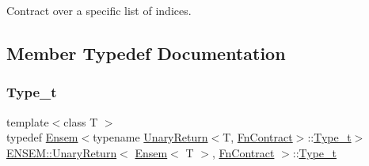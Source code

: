 Contract over a specific list of indices. 

\subsection{Member Typedef Documentation}
\mbox{\label{structENSEM_1_1UnaryReturn_3_01Ensem_3_01T_01_4_00_01FnContract_01_4_a3be6c264185868ff0356a15a3b802b83}} 
\subsubsection{\texorpdfstring{Type\_t}{Type\_t}\hspace{0.1cm}{\footnotesize\ttfamily [1/2]}}
{\footnotesize\ttfamily template$<$class T $>$ \\
typedef \mbox{\hyperlink{classENSEM_1_1Ensem}{Ensem}}$<$typename \mbox{\hyperlink{structENSEM_1_1UnaryReturn}{Unary\+Return}}$<$T, \mbox{\hyperlink{structENSEM_1_1FnContract}{Fn\+Contract}}$>$\+::\mbox{\hyperlink{structENSEM_1_1UnaryReturn_3_01Ensem_3_01T_01_4_00_01FnContract_01_4_a3be6c264185868ff0356a15a3b802b83}{Type\+\_\+t}}$>$ \mbox{\hyperlink{structENSEM_1_1UnaryReturn}{E\+N\+S\+E\+M\+::\+Unary\+Return}}$<$ \mbox{\hyperlink{classENSEM_1_1Ensem}{Ensem}}$<$ T $>$, \mbox{\hyperlink{structENSEM_1_1FnContract}{Fn\+Contract}} $>$\+::\mbox{\hyperlink{structENSEM_1_1UnaryReturn_3_01Ensem_3_01T_01_4_00_01FnContract_01_4_a3be6c264185868ff0356a15a3b802b83}{Type\+\_\+t}}}

\mbox{\label{structENSEM_1_1UnaryReturn_3_01Ensem_3_01T_01_4_00_01FnContract_01_4_a3be6c264185868ff0356a15a3b802b83}} 
